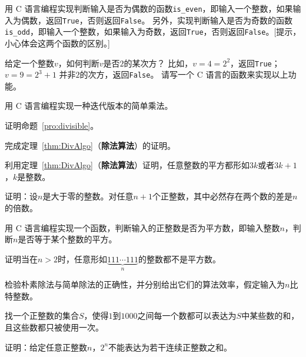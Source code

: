 \begin{problemset}
  \item 用 C 语言编程实现判断输入是否为偶数的函数\texttt{is\_even}，即输入一个整数，如果输入为偶数，返回\texttt{True}，否则返回\texttt{False}。
  另外，实现判断输入是否为奇数的函数\texttt{is\_odd}，即输入一个整数，如果输入为奇数，返回\texttt{True}，否则返回\texttt{False}。[提示，小心体会这两个函数的区别。]

  \item  给定一个整数$v$，如何判断$v$是否$2$的某次方？
  比如，$v = 4 = 2^2$，返回\texttt{True}；$v = 9 = 2^3 + 1$ 并非$2$的次方，返回\texttt{False}。
  请写一个 C 语言的函数来实现以上功能。%

  \item 用 C 语言编程实现一种迭代版本的简单乘法。

  \item 证明命题~\ref{pro:divisible}。

  \item 完成定理~\ref{thm:DivAlgo}（\textbf{除法算法}）的证明。

  \item 利用定理~\ref{thm:DivAlgo}（\textbf{除法算法}）证明，任意整数的平方都形如$3k$或者$3k+1$，$k$是整数。%

  \item 证明：设$n$是大于零的整数。对任意$n + 1$个正整数，其中必然存在两个数的差是$n$的倍数。%

  \item 用 C 语言编程实现一个函数，判断输入的正整数是否为平方数，即输入整数$n$，判断$n$是否等于某个整数的平方。

  \item 证明当在$n > 2$时，任意形如$\underbrace{111\cdots 111}_{n}$的整数都不是平方数。%

  \item 检验朴素除法与简单除法的正确性，并分别给出它们的算法效率，假定输入为$n$比特整数。


  \item 找一个正整数的集合$S$，使得$1$到$1000$之间每一个数都可以表达为$S$中某些数的和，且这些数都只被使用一次。

  \item 证明：给定任意正整数$n$，$2^n$不能表达为若干连续正整数之和。


\end{problemset}

